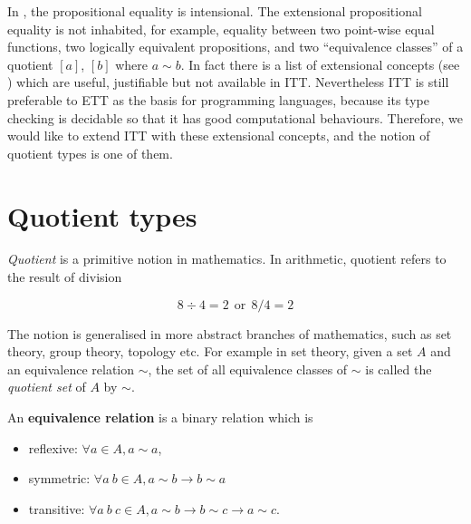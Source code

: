 In \itt, the propositional equality is intensional. The extensional propositional equality is not inhabited, for example, equality between two point-wise equal functions, two logically equivalent propositions, and two ``equivalence classes'' of a quotient $[a]$, $[b]$ where $a \sim b$.
In fact there is a list of extensional concepts (see ) which are useful, justifiable but not available in ITT.
Nevertheless ITT is still preferable to ETT as the basis for programming languages, because its type checking is decidable so that it has good computational behaviours.
Therefore, we would like to extend ITT with these extensional concepts, and the notion of quotient types is one of them. 





\section{Quotient types}


\emph{Quotient} is a primitive notion in mathematics. In arithmetic, quotient refers to the result of division

$$8 \div 4 = 2 ~~ \text{or}~~ 8/4 = 2$$

The notion is generalised in more abstract branches of mathematics, such as set theory, group theory, topology etc. For example in set theory, given a set $A$ and an equivalence relation $\sim$, the set of all equivalence classes of $\sim$ is called the \emph{quotient set} of $A$ by $\sim$.

An \textbf{equivalence relation} is a binary relation which is 

\begin{itemize}
\item reflexive: $\forall a \in A, a \sim a$,
\item symmetric: $\forall a~ b \in A, a \sim b \to b \sim a$
\item transitive: $\forall a ~ b~ c \in A, a \sim b \to b \sim c \to a \sim c$.
\end{itemize}

